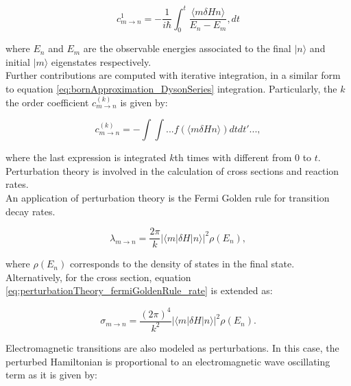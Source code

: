 \documentclass[openany]{book}
\begin{document}
\begin{equation} \label{eq:perturbationTheory_timeDeependent_c}
	c^{1}_{m\rightarrow n} = - \frac{1}{i\hbar} \int_{0}^{t} \frac{\langle m \delta H n \rangle  } {E_n - E_m}, dt 
\end{equation}

where $E_n$ and  $E_m$ are the observable energies associated to the final $|n \rangle$ and initial  $|m \rangle$ eigenstates respectively. \\

Further contributions are computed with iterative integration, in a similar form to equation \ref{eq:bornApproximation_DysonSeries} integration. Particularly, the $k$the order coefficient  $c^{(k)}_{m\rightarrow n}$ is given by:

\begin{equation} \label{eq:perturbationTheory_timeDeependent_ck}
	c^{(k)}_{m\rightarrow n} = - \int \int ...  f(\langle m \delta H  n \rangle  ) dt dt' ... ,
\end{equation}

where the last expression is integrated $k$th times with different from 0 to $t$. \\

Perturbation theory is involved in the calculation of cross sections and reaction rates. \\

An application of perturbation theory is the Fermi Golden rule for transition decay rates. 

\begin{equation} \label{eq:perturbationTheory_fermiGoldenRule_rate}
	\lambda_{m\rightarrow n} = \frac{2\pi}{k} |\langle m | \delta H| n \rangle|^2 \rho(E_n),
\end{equation}

where $\rho(E_n)$ corresponds to the density of states in the final state. Alternatively, for the cross section, equation \ref{eq:perturbationTheory_fermiGoldenRule_rate} is extended as: 

 \begin{equation} \label{eq:perturbationTheory_fermiGoldenRule_crossSection}
 	\sigma_{m\rightarrow n} = \frac{(2\pi)^4}{k^2} |\langle m | \delta H| n \rangle|^2 \rho(E_n).
 \end{equation}
 
Electromagnetic transitions are also modeled as perturbations. In this case, the perturbed Hamiltonian is proportional to an electromagnetic wave oscillating term as it is given by:
\end{document}
